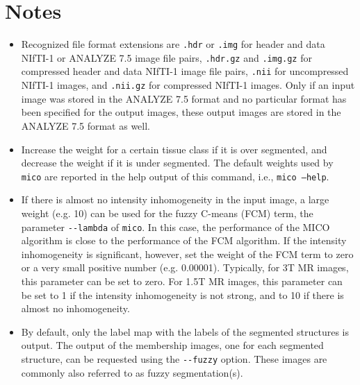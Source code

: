 \documentclass[a4paper,12pt]{article}
\begin{document}
\section{Notes}
\label{notes}

\begin{itemize}

\item Recognized file format extensions are
\texttt{.hdr} or  \texttt{.img} for header and data NIfTI-1 or ANALYZE 7.5 image
file pairs, \texttt{.hdr.gz} and \texttt{.img.gz} for compressed header and
data NIfTI-1 image file pairs, \texttt{.nii} for uncompressed NIfTI-1 images,
and \texttt{.nii.gz} for compressed NIfTI-1 images. Only if an input image was
stored in the ANALYZE 7.5 format and no particular format has been specified for
the output images, these output images are stored in the ANALYZE 7.5 format as
well.

\item Increase the weight for a certain tissue class if it is over segmented,
and decrease the weight if it is under segmented. The default weights used by
\texttt{mico} are reported in the help output of this command, i.e.,
\texttt{mico --help}.

\item If there is almost no intensity inhomogeneity in the input image,
a large weight (e.g. 10) can be used for the fuzzy C-means (FCM) term, the
parameter \texttt{-{-}lambda} of \texttt{mico}. In this case, the performance
of the MICO algorithm is close to the performance of the FCM algorithm.
If the intensity inhomogeneity is significant, however, set the weight of the
FCM term to zero or a very small positive number (e.g. 0.00001).
Typically, for 3T MR images, this parameter can be set to zero.
For 1.5T MR images, this parameter can be set to 1 if the intensity
inhomogeneity is not strong, and to 10 if there is almost no inhomogeneity.

\item By default, only the label map with the labels of the segmented structures
is output. The output of the membership images, one for each segmented structure,
can be requested using the \texttt{-{-}fuzzy} option. These images are commonly
also referred to as fuzzy segmentation(s).
\end{itemize}



\end{document}
